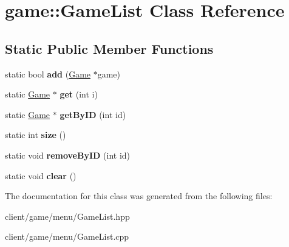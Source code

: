 \hypertarget{classgame_1_1_game_list}{\section{game\-:\-:Game\-List Class Reference}
\label{classgame_1_1_game_list}
}
\subsection*{Static Public Member Functions}
\begin{DoxyCompactItemize}
\item 
\hypertarget{classgame_1_1_game_list_ac64a178f70db317bbba1d6a057835274}{static bool {\bfseries add} (\hyperlink{classgame_1_1_game}{Game} $\ast$game)}\label{classgame_1_1_game_list_ac64a178f70db317bbba1d6a057835274}

\item 
\hypertarget{classgame_1_1_game_list_acff6a0ecf24d094bb1eaad4f5c6fdc7a}{static \hyperlink{classgame_1_1_game}{Game} $\ast$ {\bfseries get} (int i)}\label{classgame_1_1_game_list_acff6a0ecf24d094bb1eaad4f5c6fdc7a}

\item 
\hypertarget{classgame_1_1_game_list_aa442306252550aa2ad40f8c96bf7c73c}{static \hyperlink{classgame_1_1_game}{Game} $\ast$ {\bfseries get\-By\-I\-D} (int id)}\label{classgame_1_1_game_list_aa442306252550aa2ad40f8c96bf7c73c}

\item 
\hypertarget{classgame_1_1_game_list_a3c78dc648affd5b0d5c092864095bb41}{static int {\bfseries size} ()}\label{classgame_1_1_game_list_a3c78dc648affd5b0d5c092864095bb41}

\item 
\hypertarget{classgame_1_1_game_list_a613f5d92250e454924c40f599e1dc468}{static void {\bfseries remove\-By\-I\-D} (int id)}\label{classgame_1_1_game_list_a613f5d92250e454924c40f599e1dc468}

\item 
\hypertarget{classgame_1_1_game_list_ae0077eadfdfc2b35bb1d3706be0ee609}{static void {\bfseries clear} ()}\label{classgame_1_1_game_list_ae0077eadfdfc2b35bb1d3706be0ee609}

\end{DoxyCompactItemize}


The documentation for this class was generated from the following files\-:\begin{DoxyCompactItemize}
\item 
client/game/menu/Game\-List.\-hpp\item 
client/game/menu/Game\-List.\-cpp\end{DoxyCompactItemize}
